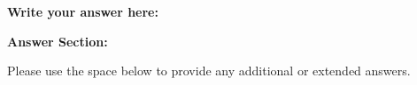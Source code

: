 \documentclass[a4paper,12pt]{article}
\begin{document}
\vspace{0.5cm}
\textbf{Write your answer here:}
\begin{tcolorbox}[colframe=black, colback=white, width=\textwidth, height=6cm, valign=center]
\end{tcolorbox}

\vspace{0.5cm}

\newpage
\textbf{Answer Section:}

\vspace{0.5cm}
Please use the space below to provide any additional or extended answers.

\begin{tcolorbox}[colframe=black, colback=white, width=\textwidth, height=0.5\textheight, valign=center]
\end{tcolorbox}

\vspace{0.5cm}
\end{document}

